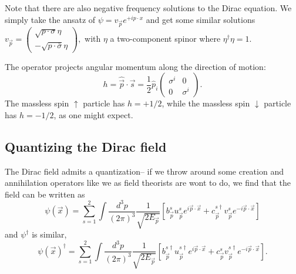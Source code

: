 Note that there are also negative frequency solutions to the Dirac equation. We simply take the ansatz of 
$\psi= v_{\vec p} e^{+ip\cdot x}$ and get some similar solutions $v_{\vec p}=\begin{pmatrix} \sqrt{p\cdot \sigma}\eta \\ -\sqrt{p \cdot \bar \sigma}\eta\end{pmatrix},$ with $\eta$ a two-component spinor where $\eta^\dagger \eta =1$.

\begin{defn} The  operator projects angular momentum along the direction of motion:
$$h=\hat{\vec p}\cdot \vec s =\frac{1}{2} \hat p_i \begin{pmatrix} \sigma^i & 0\\0&\sigma^i
\end{pmatrix}.$$
The massless spin $\uparrow$ particle has $h=+1/2$, while the massless spin $\downarrow$ particle has $h=-1/2$, as one might expect.
\end{defn}

\subsection*{Quantizing the Dirac field} The Dirac field admits a quantization-- if we throw around some creation and annihilation operators like we as field theorists are wont to do, we find that the field can be written as
$$\psi(\vec x)=\sum_{s=1}^2 \int \frac{d^3p}{(2\pi)^3}\frac{1}{\sqrt{2E_{\vec p}}} \left[ b_{\vec p}^s u_{\vec p}^s e^{i\vec p \cdot \vec x} +c_{\vec p}^{s\dagger} v_{\vec p}^s e^{-i \vec p \cdot \vec x}\right]$$
and $\psi^\dagger$ is similar,
$$\psi(\vec x)^\dagger=\sum_{s=1}^2 \int \frac{d^3p}{(2\pi)^3}\frac{1}{\sqrt{2E_{\vec p}}} \left[ b_{\vec p}^{s\dagger} u_{\vec p}^{s\dagger} e^{i\vec p \cdot \vec x} +c_{\vec p}^{s} v_{\vec p}^{s\dagger} e^{-i \vec p \cdot \vec x}\right].$$